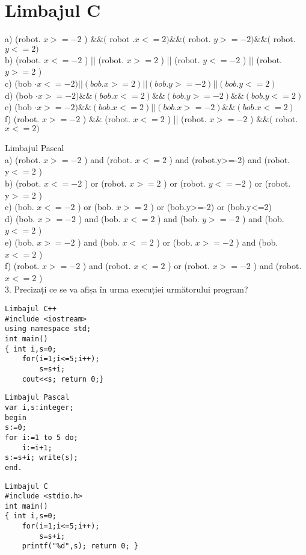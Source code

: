 \section*{Limbajul C}
a) (robot. $x>=-2$ ) $\& \&($ robot $. x<=2) \& \&($ robot. $y>=-2) \& \&($ robot. $y<=2)$\\
b) (robot. $x<=-2$ ) || (robot. $x>=2$ ) || (robot. $y<=-2$ ) || (robot. $y>=2$ )\\
c) (bob $\cdot x<=-2)||(b o b . x>=2)||(b o b . y>=-2)|\mid(b o b . y<=2)$\\
d) (bob $\cdot x>=-2) \& \&(b o b . x<=2) \& \&(b o b . y>=-2) \& \&(b o b . y<=2)$\\
e) (bob $\cdot x>=-2) \& \&(b o b . x<=2)|\mid(b o b . x>=-2) \& \&(b o b . x<=2)$\\
f) (robot. $x>=-2$ ) \&\& (robot. $x<=2$ ) || (robot. $x>=-2$ ) $\& \&($ robot. $x<=2)$

Limbajul Pascal\\
a) (robot. $x>=-2$ ) and (robot. $x<=2$ ) and (robot.y>=-2) and (robot. $\mathrm{y}<=2$ )\\
b) (robot. $x<=-2$ ) or (robot. $x>=2$ ) or (robot. $y<=-2$ ) or (robot. $\mathrm{y}>=2$ )\\
c) (bob. $x<=-2$ ) or (bob. $x>=2$ ) or (bob.y>=-2) or (bob.y<=2)\\
d) (bob. $x>=-2$ ) and (bob. $x<=2$ ) and (bob. $y>=-2$ ) and (bob. $y<=2$ )\\
e) (bob. $x>=-2$ ) and (bob. $x<=2$ ) or (bob. $x>=-2$ ) and (bob. $x<=2$ )\\
f) (robot. $x>=-2$ ) and (robot. $x<=2$ ) or (robot. $x>=-2$ ) and (robot. $x<=2$ )\\
3. Precizați ce se va afișa în urma execuției următorului program?

\begin{verbatim}
Limbajul C++
#include <iostream>
using namespace std;
int main()
{ int i,s=0;
    for(i=1;i<=5;i++);
        s=s+i;
    cout<<s; return 0;}
\end{verbatim}

\begin{verbatim}
Limbajul Pascal
var i,s:integer;
begin
s:=0;
for i:=1 to 5 do;
    i:=i+1;
s:=s+i; write(s);
end.
\end{verbatim}

\begin{verbatim}
Limbajul C
#include <stdio.h>
int main()
{ int i,s=0;
    for(i=1;i<=5;i++);
        s=s+i;
    printf("%d",s); return 0; }
\end{verbatim}

